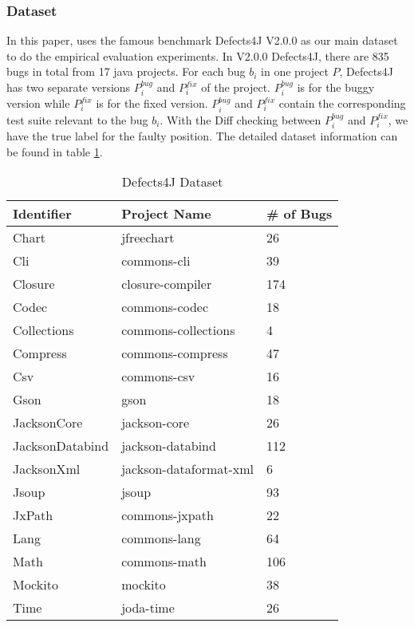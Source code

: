 \subsubsection{Dataset}

In this paper, \tool uses the famous benchmark Defects4J V2.0.0 \cite{defects4j} as our main dataset to do the empirical evaluation experiments. In V2.0.0 Defects4J, there are 835 bugs in total from 17 java projects. For each bug $b_i$ in one project $P$, Defects4J has two separate versions $P_i^{bug}$ and $P_i^{fix}$ of the project. $P_i^{bug}$ is for the buggy version while $P_i^{fix}$ is for the fixed version. $P_i^{bug}$ and $P_i^{fix}$ contain the corresponding test suite relevant to the bug $b_i$. With the Diff checking between $P_i^{bug}$ and $P_i^{fix}$, we have the true label for the faulty position. The detailed dataset information can be found in table \ref{dataset}.

\begin{table}[t]
	\caption{Defects4J Dataset}
	\begin{center}
		\renewcommand{\arraystretch}{1}
		\begin{tabular}{p{2.2cm}|p{3.3cm}|p{1.5cm}}\hline
			\hline
			Identifier &  Project Name & \# of Bugs\\
			\hline
			Chart & jfreechart & 26\\
			Cli & 	commons-cli & 39\\
			Closure & closure-compiler	 & 174\\
			Codec & commons-codec & 18\\
			Collections & commons-collections & 4\\
			Compress & commons-compress	 & 47\\
			Csv & 	commons-csv & 16\\
			Gson & gson & 18\\
			JacksonCore & jackson-core & 26\\
			JacksonDatabind & jackson-databind	 & 112\\
			JacksonXml & 	jackson-dataformat-xml & 6\\
			Jsoup	 & jsoup & 93\\
			JxPath & commons-jxpath & 22\\
			Lang & 	commons-lang & 64\\
			Math & 	commons-math & 106\\
			Mockito	 & mockito & 38\\
			Time & joda-time & 26\\			
			\hline
		\end{tabular}
		\label{dataset}
	\end{center}
\end{table}